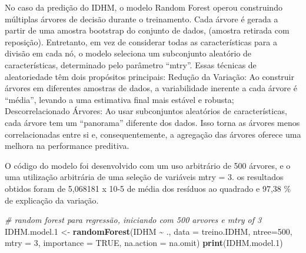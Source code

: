 \documentclass[
]{article}
\newenvironment{Shaded}{\begin{snugshade}}{\end{snugshade}}
\newcommand{\AttributeTok}[1]{\textcolor[rgb]{0.13,0.29,0.53}{#1}}
\newcommand{\CommentTok}[1]{\textcolor[rgb]{0.56,0.35,0.01}{\textit{#1}}}
\newcommand{\ConstantTok}[1]{\textcolor[rgb]{0.56,0.35,0.01}{#1}}
\newcommand{\DecValTok}[1]{\textcolor[rgb]{0.00,0.00,0.81}{#1}}
\newcommand{\FloatTok}[1]{\textcolor[rgb]{0.00,0.00,0.81}{#1}}
\newcommand{\FunctionTok}[1]{\textcolor[rgb]{0.13,0.29,0.53}{\textbf{#1}}}
\newcommand{\NormalTok}[1]{#1}
\newcommand{\OtherTok}[1]{\textcolor[rgb]{0.56,0.35,0.01}{#1}}
\newcommand{\SpecialCharTok}[1]{\textcolor[rgb]{0.81,0.36,0.00}{\textbf{#1}}}
\begin{document}
\begin{Shaded}
\end{Shaded}

No caso da predição do IDHM, o modelo Random Forest operou construindo
múltiplas árvores de decisão durante o treinamento. Cada árvore é gerada
a partir de uma amostra bootstrap do conjunto de dados, (amostra
retirada com reposição). Entretanto, em vez de considerar todas as
características para a divisão em cada nó, o modelo seleciona um
subconjunto aleatório de características, determinado pelo parâmetro
``mtry''. Essas técnicas de aleatoriedade têm dois propósitos
principais: Redução da Variação: Ao construir árvores em diferentes
amostras de dados, a variabilidade inerente a cada árvore é ``média'',
levando a uma estimativa final mais estável e robusta; Descorrelacionado
Árvores: Ao usar subconjuntos aleatórios de características, cada árvore
tem um ``panorama'' diferente dos dados. Isso torna as árvores menos
correlacionadas entre si e, consequentemente, a agregação das árvores
oferece uma melhora na performance preditiva.

O código do modelo foi desenvolvido com um uso arbitrário de 500
árvores, e o uma utilização arbitrária de uma seleção de variáveis mtry
= 3. os resultados obtidos foram de 5,068181 x 10-5 de média dos
resíduos ao quadrado e 97,38 \% de explicação da variação.

\begin{Shaded}
\begin{Highlighting}[]
\CommentTok{\# random forest para regressão, iniciando com 500 arvores e mtry of 3}
\NormalTok{IDHM.model}\FloatTok{.1} \OtherTok{\textless{}{-}} \FunctionTok{randomForest}\NormalTok{(IDHM }\SpecialCharTok{\textasciitilde{}}\NormalTok{ ., }\AttributeTok{data =}\NormalTok{ treino.IDHM, }\AttributeTok{ntree=}\DecValTok{500}\NormalTok{, }\AttributeTok{mtry =} \DecValTok{3}\NormalTok{, }
                         \AttributeTok{importance =} \ConstantTok{TRUE}\NormalTok{, }\AttributeTok{na.action =}\NormalTok{ na.omit) }
\FunctionTok{print}\NormalTok{(IDHM.model}\FloatTok{.1}\NormalTok{) }
\end{Highlighting}
\end{Shaded}
\end{document}
